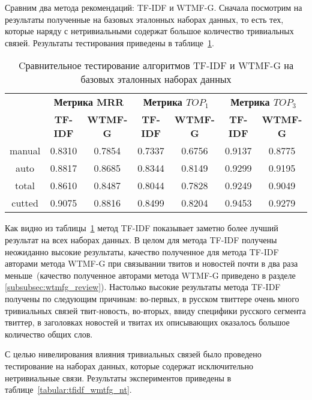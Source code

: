     Сравним два метода рекомендаций: TF-IDF и WTMF-G. Сначала посмотрим на результаты полученные на 
    базовых эталонных наборах данных, то есть тех, которые наряду с нетривиальными содержат большое количество тривиальных связей.
    Результаты тестирования приведены в таблице~\ref{tabular:tfidf_wmtfg}.

    \begin{table}[ht!]
    \caption{Cравнительное тестирование алгоритмов TF-IDF и WTMF-G на базовых эталонных наборах данных \bigskip}
    \centering

    \label{tabular:tfidf_wmtfg}
        \begin{tabular}{|c|c|c|c|c|c|c|}
            \hline
            \bf{\multirow{2}{*}{\specialcell{Набор данных}}} &
            \multicolumn{2}{|c|}{\bf{Метрика MRR}} &
            \multicolumn{2}{|c|}{\bf{Метрика $TOP_1$}} &
            \multicolumn{2}{|c|}{\bf{Метрика $TOP_3$}} \\ \cline{2-7}
            & \bf{TF-IDF} & \bf{WTMF-G} & \bf{TF-IDF} & \bf{WTMF-G} & \bf{TF-IDF} & \bf{WTMF-G} \\ \hline
            manual & 0.8310 & 0.7854 & 0.7337 & 0.6756 & 0.9137 & 0.8775 \\ \hline
            auto   & 0.8817 & 0.8685 & 0.8344 & 0.8149 & 0.9299 & 0.9195 \\ \hline
            total  & 0.8610 & 0.8487 & 0.8044 & 0.7828 & 0.9249 & 0.9049 \\ \hline
            cutted & 0.9075 & 0.8816 & 0.8499 & 0.8204 & 0.9453 & 0.9279 \\ \hline
        \end{tabular}
    \end{table}

    Как видно из таблицы~\ref{tabular:tfidf_wmtfg} метод TF-IDF показывает заметно более лучший результат на всех наборах данных.
    В целом для метода TF-IDF получены неожиданно высокие результаты, качество полученное для метода TF-IDF авторами метода WTMF-G при связывании твитов и новостей
    почти в два раза меньше~(качество полученное авторами метода WTMF-G приведено в разделе \ref{subsubsec:wtmfg_review}).
    Настолько высокие результаты метода TF-IDF получены по следующим причинам: во-первых, в русском твиттере очень много тривиальных связей твит-новость,
    во-вторых, ввиду специфики русского сегмента твиттер, в заголовках новостей и твитах их описывающих оказалось большое количество общих слов.

    С целью нивелирования влияния тривиальных связей было проведено тестирование на наборах данных, которые содержат исключительно нетривиальные связи.
    Результаты экспериментов приведены в таблице~\ref{tabular:tfidf_wmtfg_nt}.


